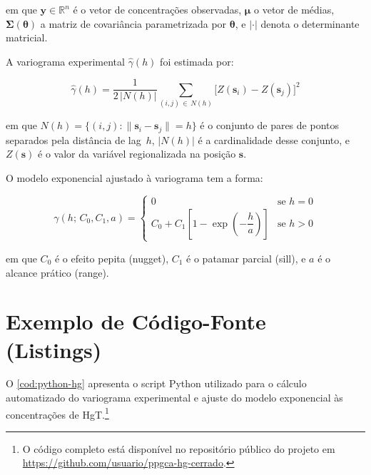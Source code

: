 \noindent em que $\mathbf{y} \in \mathbb{R}^n$ é o vetor de
concentrações observadas, $\boldsymbol{\mu}$ o vetor de médias,
$\boldsymbol{\Sigma}(\boldsymbol{\theta})$ a matriz de
covariância parametrizada por $\boldsymbol{\theta}$, e
$|\cdot|$ denota o determinante matricial.

A variograma experimental $\hat{\gamma}(h)$ foi estimada por:

\begin{equation}
  \label{eq:variograma}
  \hat{\gamma}(h) =
    \frac{1}{2\,|N(h)|}
    \sum_{(i,j)\,\in\,N(h)}
    \bigl[Z(\mathbf{s}_i) - Z(\mathbf{s}_j)\bigr]^2
\end{equation}

\noindent em que $N(h) = \{(i,j) : \|\mathbf{s}_i - \mathbf{s}_j\| = h\}$
é o conjunto de pares de pontos separados pela distância de lag~$h$,
$|N(h)|$ é a cardinalidade desse conjunto, e $Z(\mathbf{s})$ é
o valor da variável regionalizada na posição $\mathbf{s}$.

O modelo exponencial ajustado à variograma tem a forma:

\begin{equation}
  \label{eq:modelo-exponencial}
  \gamma(h;\, C_0, C_1, a) =
  \begin{cases}
    0 & \text{se } h = 0 \\[4pt]
    C_0 + C_1
      \left[1 - \exp\!\left(-\dfrac{h}{a}\right)\right]
    & \text{se } h > 0
  \end{cases}
\end{equation}

\noindent em que $C_0$ é o efeito pepita (nugget), $C_1$ é o
patamar parcial (sill), e $a$ é o alcance prático (range).

\section{Exemplo de Código-Fonte (Listings)}

O \autoref{cod:python-hg} apresenta o script Python utilizado para
o cálculo automatizado do variograma experimental e ajuste do modelo
exponencial às concentrações de HgT.\footnote{O código completo está
disponível no repositório público do projeto em
\url{https://github.com/usuario/ppgca-hg-cerrado}.}

